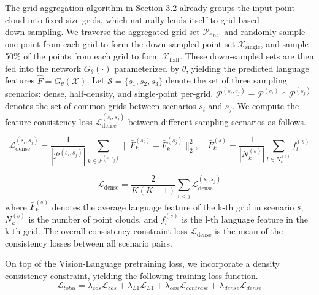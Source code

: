 \documentclass{article}
\begin{document}
The grid aggregation algorithm in Section 3.2 already groups the input point cloud into fixed‑size grids, which naturally lends itself to grid‑based down‑sampling. We traverse the aggregated grid set $\mathcal{P}_{\text{final}}$ and randomly sample one point from each grid to form the down‑sampled point set $\mathcal{X}_{\text{single}}$, and sample 50\% of the points from each grid to form $\mathcal{X}_{\text{half}}$. These down‑sampled sets are then fed into the network $G_{\theta}(\cdot)$ parameterized by $\theta$, yielding the predicted language features $\hat{F} = G_{\theta}(\mathcal{X})$. Let $\mathcal{S} = \{s_1, s_2, s_3\}$ denote the set of three sampling scenarios: dense, half‑density, and single‑point per‑grid. $\mathcal{P}^{(s_i,s_j)} = \mathcal{P}^{(s_i)} \cap \mathcal{P}^{(s_j)}$ denotes the set of common grids between scenarios $s_i$ and $s_j$. We compute the feature consistency loss $\mathcal{L}_{\text{dense}}^{(s_i,s_j)}$ between different sampling scenarios as follows.

\begin{equation}
    \mathcal{L}_{\text{dense}}^{(s_i,s_j)} = \frac{1}{|\mathcal{P}^{(s_i,s_j)}|} \sum_{k \in \mathcal{P}^{(s_i,s_j)}} \|\bar{F}_k^{(s_i)} - \bar{F}_k^{(s_j)}\|_2^2, \quad \bar{F}_k^{(s)} = \frac{1}{|N_k^{(s)}|} \sum_{l \in N_k^{(s)}} f_l^{(s)}
     \label{eq:loss-dense-perscene}
\end{equation}
  
\begin{equation}
    \mathcal{L}_{\text{dense}} = \frac{2}{K(K-1)} \sum_{i < j} \mathcal{L}_{\text{dense}}^{(s_i,s_j)}
\end{equation}
where $\bar{F}_k^{(s)}$ denotes the average language feature of the k-th grid in scenario $s$, $N_k^{(s)}$ is the number of point clouds, and $f_l^{(s)}$ is the l-th language feature in the k-th grid. The overall consistency constraint loss $\mathcal{L}_{\text{dense}}$ is the mean of the consistency losses between all scenario pairs. 

On top of the Vision‑Language pretraining loss\cite{li2025scenesplat}, we incorporate a density consistency constraint, yielding the following training loss function.
\begin{equation}
    \mathcal{L}_{total} = \lambda_{cos}\mathcal{L}_{cos} + \lambda_{L1}\mathcal{L}_{L1} + \lambda_{con}\mathcal{L}_{contrast} + \lambda_{dense}\mathcal{L}_{dense}
    \label{eq:total-loss}
\end{equation}
\end{document}
